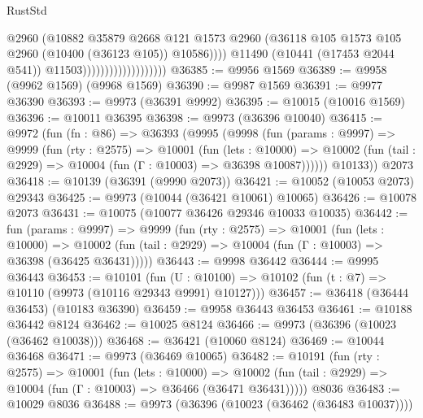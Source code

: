 \begin{lexlean}{RustStd}
\begin{coremodule}
                                              @2960
                                              (@10882
                                                @35879
                                                @2668
                                                @121
                                                @1573
                                                @2960
                                                (@36118
                                                  @105
                                                  @1573
                                                  @105
                                                  @2960
                                                  (@10400 (@36123 @105))
                                                  @10586))))
                                          @11490
                                          (@10441 (@17453 @2044 @541))
                                          @11503)))))))))))))))))))
@36385 := @9956 @1569
@36389 := @9958 (@9962 @1569) (@9968 @1569)
@36390 := @9987 @1569
@36391 := @9977 @36390
@36393 := @9973 (@36391 @9992)
@36395 := @10015 (@10016 @1569)
@36396 := @10011 @36395
@36398 := @9973 (@36396 @10040)
@36415 := @9972
    (fun (fn : @86) =>
    @36393
      (@9995
        (@9998
          (fun (params : @9997) =>
          @9999
            (fun (rty : @2575) =>
            @10001
              (fun (lets : @10000) =>
              @10002 (fun (tail : @2929) => @10004 (fun (Γ : @10003) => @36398 @10087))))))
        @10133))
    @2073
@36418 := @10139 (@36391 (@9990 @2073))
@36421 := @10052 (@10053 @2073) @29343
@36425 := @9973 (@10044 (@36421 @10061) @10065)
@36426 := @10078 @2073
@36431 := @10075 (@10077 @36426 @29346 @10033 @10035)
@36442 := fun (params : @9997) =>
  @9999
    (fun (rty : @2575) =>
    @10001
      (fun (lets : @10000) =>
      @10002 (fun (tail : @2929) => @10004 (fun (Γ : @10003) => @36398 (@36425 @36431)))))
@36443 := @9998 @36442
@36444 := @9995 @36443
@36453 := @10101
    (fun (U : @10100) => @10102 (fun (t : @7) => @10110 (@9973 (@10116 @29343 @9991) @10127)))
@36457 := @36418 (@36444 @36453) (@10183 @36390)
@36459 := @9958 @36443 @36453
@36461 := @10188 @36442 @8124
@36462 := @10025 @8124
@36466 := @9973 (@36396 (@10023 (@36462 @10038)))
@36468 := @36421 (@10060 @8124)
@36469 := @10044 @36468
@36471 := @9973 (@36469 @10065)
@36482 := @10191
    (fun (rty : @2575) =>
    @10001
      (fun (lets : @10000) =>
      @10002 (fun (tail : @2929) => @10004 (fun (Γ : @10003) => @36466 (@36471 @36431)))))
    @8036
@36483 := @10029 @8036
@36488 := @9973 (@36396 (@10023 (@36462 (@36483 @10037))))

\end{coremodule}
\end{lexlean}
